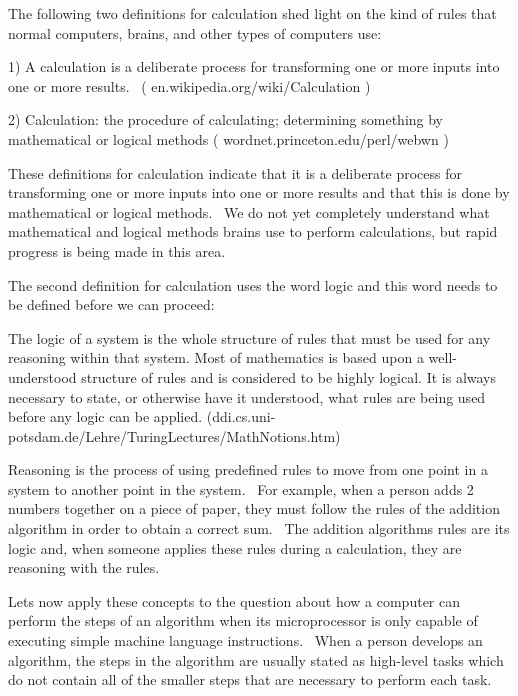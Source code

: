 \documentclass[12pt,twoside]{book}
\begin{document}
\bigskip

The following two definitions for calculation shed light on the kind of rules that normal computers, brains, and other types of computers use: 

\bigskip

1) A calculation is a deliberate process for transforming one or more inputs into one or more results. \ ( en.wikipedia.org/wiki/Calculation ) 

\bigskip

2) Calculation: the procedure of calculating; determining something by mathematical or logical methods ( wordnet.princeton.edu/perl/webwn ) 

\bigskip

These definitions for calculation indicate that it {\textquotedbl}is a deliberate process for transforming one or more inputs into one or more results{\textquotedbl} and that this is done {\textquotedbl}by mathematical or logical methods{\textquotedbl}. \ We do not yet completely understand what mathematical and logical methods brains use to perform calculations, but rapid progress is being made in this area. 

\bigskip

The second definition for calculation uses the word logic and this word needs to be defined before we can proceed: 

\bigskip

The logic of a system is the whole structure of rules that must be used for any reasoning within that system. Most of mathematics is based upon a well{}-understood structure of rules and is considered to be highly logical. It is always necessary to state, or otherwise have it understood, what rules are being used before any logic can be applied. (ddi.cs.uni{}-potsdam.de/Lehre/TuringLectures/MathNotions.htm)


\bigskip

Reasoning is the process of using predefined rules to move from one point in a system to another point in the system. \ For example, when a person adds 2 numbers together on a piece of paper, they must follow the rules of the addition algorithm in order to obtain a correct sum. \ The addition algorithm{\textquotesingle}s rules are its logic and, when someone applies these rules during a calculation, they are reasoning with the rules. 

\bigskip

Lets now apply these concepts to the question about how a computer can perform the steps of an algorithm when its microprocessor is only capable of executing simple machine language instructions. \ When a person develops an algorithm, the steps in the algorithm are usually stated as high{}-level tasks which do not contain all of the smaller steps that are necessary to perform each task. 
\end{document}
